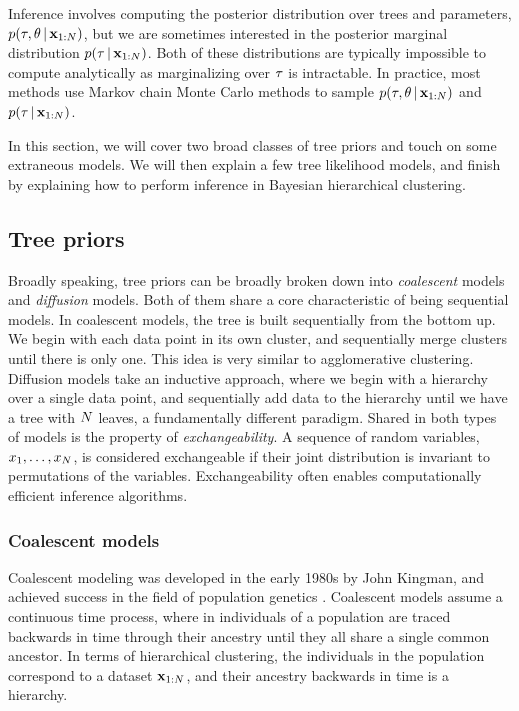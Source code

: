 Inference involves computing the posterior
distribution over trees and parameters, 
$p(\tau, \theta \,|\, \mathbf{x}_{1:N})$, but we are sometimes interested
in the
posterior marginal distribution $p(\tau \,|\, \mathbf{x}_{1:N})$.
Both of these distributions are typically
impossible to compute
analytically as marginalizing over $\tau$
is intractable.
In practice, most methods use Markov chain Monte Carlo
methods to sample $p(\tau, \theta \,|\, \mathbf{x}_{1:N})$
and $p(\tau \,|\, \mathbf{x}_{1:N})$.

In this section, we will cover two broad
classes of tree priors and touch on
some extraneous models. We will then explain
a few tree likelihood models, and 
finish by explaining how to perform
inference in Bayesian hierarchical clustering.

\subsection{Tree priors}

Broadly speaking, 
tree priors can be broadly broken down into 
\emph{coalescent} models
and 
\emph{diffusion} models.
Both of them share a core characteristic
of being sequential models.
In coalescent models, the tree is built sequentially
from the bottom up. We begin with each
data point in its own cluster,
and sequentially merge clusters until
there is only one. This idea is
very similar to agglomerative clustering.
Diffusion models take an inductive approach,
where we begin with a hierarchy over a single
data point, and sequentially add data to the hierarchy until
we have a tree with $N$ leaves,
a fundamentally different paradigm.
Shared in both types of models is the property
of
\emph{exchangeability}.
A sequence of random variables, $x_1, \ldots, x_N$,
is considered exchangeable
if their joint distribution
is invariant to permutations of the variables.
Exchangeability often enables computationally efficient
inference algorithms.

\subsubsection*{Coalescent models}

Coalescent modeling was developed
in the early 1980s by John Kingman,
and achieved success in the field
of population genetics
\citep{Kingman1982}.
Coalescent models assume a
continuous time process,
where in individuals of a population
are traced backwards in time
through their ancestry until
they all share a single common ancestor.
In terms of hierarchical clustering,
the individuals in the population
correspond to a dataset $\mathbf{x}_{1:N}$,
and their
ancestry backwards in time
is a hierarchy.

